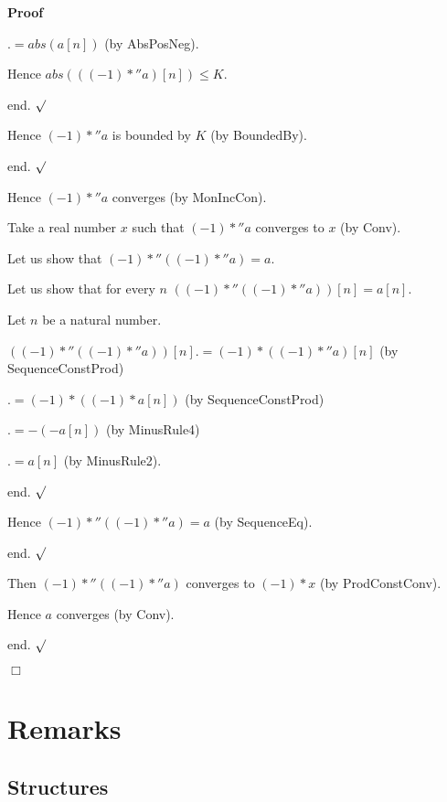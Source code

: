 \documentclass{article}
\newenvironment{forthel}{\begin{leftbar}}{\end{leftbar}}
\newenvironment{proof}{\noindent\textbf{Proof\ }}{\hspace*{\fill}$\Box$\medskip}
\newenvironment{subproof}{\begin{list}{}{}
		\item[\text{Proof}]}{\hfill $\surd$ \end{list}}
\begin{document}
\begin{forthel}
\begin{proof}
\begin{subproof}
\begin{subproof}
\begin{subproof}
					$.= abs(a[n])$ (by AbsPosNeg).
					
					Hence $abs(((-1) *'' a)[n]) \leq K$.
					
					end.
				\end{subproof}
				
				Hence $(-1) *'' a$ is bounded by $K$ (by BoundedBy).
				
				end.
			\end{subproof}
			
			Hence $(-1) *'' a$ converges (by MonIncCon).
			
			Take a real number $x$ such that $(-1) *'' a$ converges to $x$ (by Conv).
			
			Let us show that $(-1) *'' ((-1) *'' a) = a$.
			
			\begin{subproof}
				Let us show that for every $n$ $((-1) *'' ((-1) *'' a))[n] = a[n]$.
				
				\begin{subproof}
					Let $n$ be a natural number.
					
					$((-1) *'' ((-1) *'' a))[n] .= (-1) * ((-1) *'' a)[n]$ (by SequenceConstProd)
					
					$.= (-1) * ((-1) * a[n])$ (by SequenceConstProd)
					
					$.= -(-a[n])$ (by MinusRule4)
					
					$.= a[n]$ (by MinusRule2).
					
					end.					
				\end{subproof}
				
				Hence $(-1) *'' ((-1) *'' a) = a$ (by SequenceEq).
				
				end.
			\end{subproof}
		
			Then $(-1) *'' ((-1) *'' a)$ converges to $(-1) * x$ (by ProdConstConv).
			
			Hence $a$ converges (by Conv).
			
			end.
		\end{subproof}
		
	\end{proof}
	
\end{forthel}

\section{Remarks}
\subsection{Structures}
\end{document}
